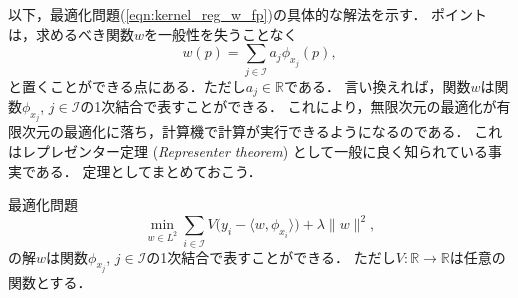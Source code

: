 以下，最適化問題(\ref{eqn:kernel_reg_w_fp})の具体的な解法を示す．
ポイントは，求めるべき関数$w$を一般性を失うことなく
\begin{equation}
\label{eqn:kernel_reg_key}
w(p) = \sum_{j \in \mathcal{I}} a_j \phi_{x_j}(p),
\end{equation}
と置くことができる点にある．ただし$a_j \in \mathbb{R}$である．
言い換えれば，関数$w$は関数$\phi_{x_j}$, $j \in \mathcal{I}$の1次結合で表すことができる．
これにより，無限次元の最適化が有限次元の最適化に落ち，計算機で計算が実行できるようになるのである．
これはレプレゼンター定理 (\textit{Representer theorem}) として一般に良く知られている事実である．
定理としてまとめておこう．

\begin{theorem}[リプレゼンター定理]
最適化問題
\begin{equation*}
\min_{w \in L^2} \sum_{i \in \mathcal{I}} V \bigl( y_i - \langle w, \phi_{x_i} \rangle \bigr) + \lambda \| w \|^2,
\end{equation*}
の解$w$は関数$\phi_{x_j}$, $j \in \mathcal{I}$の1次結合で表すことができる．
ただし$V: \mathbb{R} \to \mathbb{R}$は任意の関数とする．
\end{theorem}
